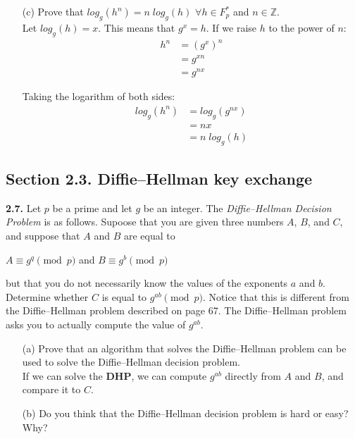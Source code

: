 \documentclass[11pt,fleqn]{article}
\newcommand{\Z}{\mathbb{Z}}
\begin{document}
\begin{itemize}
\item[(c)] Prove that $log_g (h^n) = n \; log_g (h)$ $\forall h \in F_p^*$ and $n \in \Z$.\\
  Let $log_g (h) = x$.  This means that $g^{x} = h$.  If we raise $h$ to the power of $n$:
\begin{align}
  h^n &= (g^{x})^n\\
          &= g^{xn}\\
          &= g^{nx}
\end{align}

Taking the logarithm of both sides:
\begin{align}
  log_g (h^n) &= log_g (g^{nx})\\
  &= nx\\
  &= n\;log_g (h)
\end{align}
  
\end{itemize}

\subsection*{Section 2.3. Diffie–Hellman key exchange}

\textbf{2.7.} Let $p$ be a prime and let $g$ be an integer. The \textit{Diffie–Hellman Decision Problem} is as follows. Supoose that you are given three numbers $A$, $B$, and $C$, and suppose that $A$ and $B$ are equal to
\begin{center}
$A \equiv g^q \pmod{p}$  and  $B \equiv g^b \pmod{p}$
\end{center}
but that you do not necessarily know the values of the exponents $a$ and $b$. Determine whether $C$ is equal to $g^{ab} \pmod{p}$. Notice that this is different from the Diffie–Hellman problem described on page 67. The Diffie–Hellman problem asks you to actually compute the value of $g^{ab}$. 
\begin{itemize}
\item[(a)] Prove that an algorithm that solves the Diffie–Hellman problem can be used to solve the Diffie–Hellman decision problem. \\
  If we can solve the \textbf{DHP}, we can compute $g^{ab}$ directly from $A$ and $B$, and compare it to $C$.  
\item[(b)] Do you think that the Diffie–Hellman decision problem is hard or easy? Why? \\
  
\end{itemize}
\end{document}
